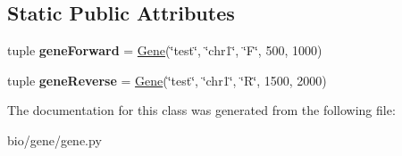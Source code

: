 \subsection*{Static Public Attributes}
\begin{DoxyCompactItemize}
\item 
\hypertarget{classgene_1_1_gene_test_ae96763b3569f91d16621d96a46664b37}{tuple {\bfseries gene\+Forward} = \hyperlink{classgene_1_1_gene}{Gene}(\char`\"{}test\char`\"{}, \char`\"{}chr1\char`\"{}, \char`\"{}F\char`\"{}, 500, 1000)}\label{classgene_1_1_gene_test_ae96763b3569f91d16621d96a46664b37}

\item 
\hypertarget{classgene_1_1_gene_test_a5167ddb04d3f17a8f6598e7c0566ce38}{tuple {\bfseries gene\+Reverse} = \hyperlink{classgene_1_1_gene}{Gene}(\char`\"{}test\char`\"{}, \char`\"{}chr1\char`\"{}, \char`\"{}R\char`\"{}, 1500, 2000)}\label{classgene_1_1_gene_test_a5167ddb04d3f17a8f6598e7c0566ce38}

\end{DoxyCompactItemize}


The documentation for this class was generated from the following file\+:\begin{DoxyCompactItemize}
\item 
bio/gene/gene.\+py\end{DoxyCompactItemize}
